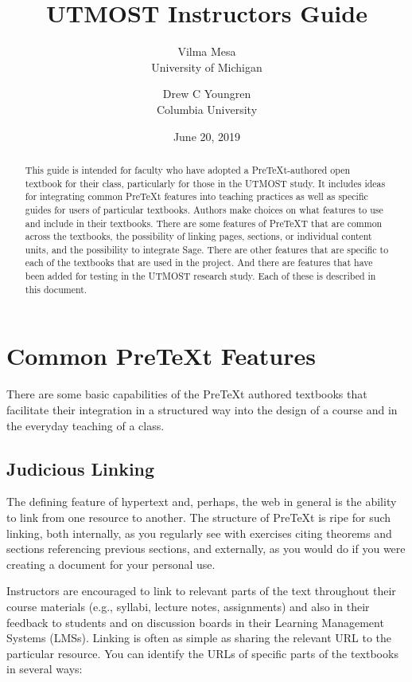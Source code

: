 \documentclass[10pt,]{article}
\title{UTMOST Instructors Guide}
\author{Vilma Mesa\\
University of Michigan
\and
Drew C Youngren\\
Columbia University
}
\date{June 20, 2019}
\begin{document}
\hypertarget{uig}{}
\maketitle
\thispagestyle{empty}
\begin{abstract}
\hypertarget{p-1}{}%
This guide is intended for faculty who have adopted a PreTeXt-authored open textbook for their class, particularly for those in the UTMOST study. It includes ideas for integrating common PreTeXt features into teaching practices as well as specific guides for users of particular textbooks. Authors make choices on what features to use and include in their textbooks. There are some features of PreTeXT that are common across the textbooks, the possibility of linking pages, sections, or individual content units, and the possibility to integrate Sage. There are other features that are specific to each of the textbooks that are used in the project. And there are features that have been added for testing in the UTMOST research study. Each of these is described in this document.%
\end{abstract}
\typeout{************************************************}
\typeout{************************************************}
\section[{Common PreTeXt Features}]{Common PreTeXt Features}\label{section-textual}
\hypertarget{p-4}{}%
There are some basic capabilities of the PreTeXt authored textbooks that facilitate their integration in a structured way into the design of a course and in the everyday teaching of a class.%
\typeout{************************************************}
\typeout{************************************************}
\subsection[{Judicious Linking}]{Judicious Linking}\label{subsection-linking}
\hypertarget{p-5}{}%
The defining feature of hypertext and, perhaps, the web in general is the ability to link from one resource to another. The structure of PreTeXt is ripe for such linking, both internally, as you regularly see with exercises citing theorems and sections referencing previous sections, and externally, as you would do if you were creating a document for your personal use.%
\par
\hypertarget{p-6}{}%
Instructors are encouraged to link to relevant parts of the text throughout their course materials (e.g., syllabi, lecture notes, assignments) and also in their feedback to students and on discussion boards in their Learning Management Systems (LMSs). Linking is often as simple as sharing the relevant URL to the particular resource. You can identify the URLs of specific parts of the textbooks in several ways:%
\typeout{************************************************}
\typeout{************************************************}
\end{document}
